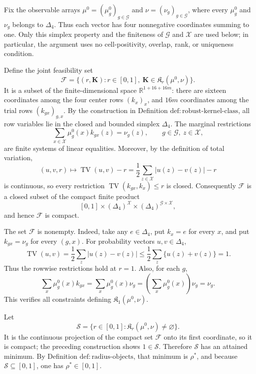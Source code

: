 Fix the observable arrays \(\mu^0=(\mu_g^0)_{g\in\mathcal G}\) and \(\nu=(\nu_g)_{g\in\mathcal G}\), where every \(\mu_g^0\) and \(\nu_g\) belongs to \(\Delta_4\).  Thus each vector has four nonnegative coordinates summing to one.  Only this simplex property and the finiteness of \(\mathcal G\) and \(\mathcal X\) are used below; in particular, the argument uses no cell-positivity, overlap, rank, or uniqueness condition.

Define the joint feasibility set
\[
 \mathcal F
 =\bigl\{(r,\mathbf K):r\in[0,1],\ \mathbf K\in\mathfrak K_r(\mu^0,\nu)\bigr\}.
\]
It is a subset of the finite-dimensional space \(\mathbb R^{1+16+16m}\): there are sixteen coordinates among the four center rows \((k_x)_x\), and \(16m\) coordinates among the trial rows \((k_{gx})_{g,x}\).  By the construction in Definition \(\mathrm{def:robust\mbox{-}kernel\mbox{-}class}\), all row variables lie in the closed and bounded simplex \(\Delta_4\).  The marginal restrictions
\[
 \sum_{x\in\mathcal X}\mu_g^0(x)k_{gx}(z)=\nu_g(z),
 \qquad g\in\mathcal G,\ z\in\mathcal X,
\]
are finite systems of linear equalities.  Moreover, by the definition of total variation,
\[
 (u,v,r)\longmapsto \operatorname{TV}(u,v)-r
 =\frac12\sum_{z\in\mathcal X}|u(z)-v(z)|-r
\]
is continuous, so every restriction \(\operatorname{TV}(k_{gx},k_x)\le r\) is closed.  Consequently \(\mathcal F\) is a closed subset of the compact finite product
\[
 [0,1]\times(\Delta_4)^{\mathcal X}
 \times(\Delta_4)^{\mathcal G\times\mathcal X},
\]
and hence \(\mathcal F\) is compact.

The set \(\mathcal F\) is nonempty.  Indeed, take any \(e\in\Delta_4\), put \(k_x=e\) for every \(x\), and put \(k_{gx}=\nu_g\) for every \((g,x)\).  For probability vectors \(u,v\in\Delta_4\),
\[
 \operatorname{TV}(u,v)
 =\frac12\sum_z|u(z)-v(z)|
 \le \frac12\sum_z\{u(z)+v(z)\}=1.
\]
Thus the rowwise restrictions hold at \(r=1\).  Also, for each \(g\),
\[
 \sum_x\mu_g^0(x)k_{gx}
 =\sum_x\mu_g^0(x)\nu_g
 =\left(\sum_x\mu_g^0(x)\right)\nu_g
 =\nu_g.
\]
This verifies all constraints defining \(\mathfrak K_1(\mu^0,\nu)\).

Let
\[
 \mathcal S=\{r\in[0,1]:\mathfrak K_r(\mu^0,\nu)\ne\varnothing\}.
\]
It is the continuous projection of the compact set \(\mathcal F\) onto its first coordinate, so it is compact; the preceding construction shows \(1\in\mathcal S\).  Therefore \(\mathcal S\) has an attained minimum.  By Definition \(\mathrm{def:radius\mbox{-}objects}\), that minimum is \(\rho^*\), and because \(\mathcal S\subseteq[0,1]\), one has \(\rho^*\in[0,1]\).

